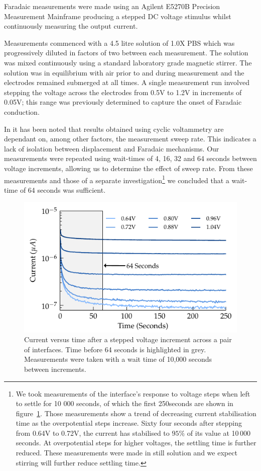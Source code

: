 \documentclass[journal, a4paper]{IEEEtran}
\begin{document}
Faradaic measurements were made using an Agilent E5270B Precision Measurement Mainframe producing a stepped DC voltage stimulus whilst continuously measuring the output current.

Measurements commenced with a 4.5 litre solution of 1.0X PBS which was progressively diluted in factors of two between each measurement. The solution was mixed continuously using a standard laboratory grade magnetic stirrer. The solution was in equilibrium with air prior to and during measurement and the electrodes remained submerged at all times.
A single measurement run involved stepping the voltage across the electrodes from 0.5\thinspace V to 1.2\thinspace V in increments of 0.05\thinspace V; this range was previously determined to capture the onset of Faradaic conduction.

In \cite{Cogan2008} it has been noted that results obtained using cyclic voltammetry are dependant on, among other factors, the measurement sweep rate. This indicates a lack of isolation between displacement and Faradaic mechanisms. Our measurements were repeated using wait-times of 4, 16, 32 and 64 seconds between voltage increments, allowing us to determine the effect of sweep rate. From these measurements and those of a separate investigation\footnote{We took measurements of the interface's response to voltage steps when left to settle for 10 000 seconds, of which the first 250\thinspace seconds are shown in figure~\ref{fig:CPE_currentVsTime}. Those measurements show a trend of decreasing current stabilisation time as the overpotential steps increase. Sixty four seconds after stepping from 0.64\thinspace V to 0.72\thinspace V, the current has stabilised to $95\%$ of its value at 10\,000 seconds. At overpotential steps for higher voltages, the settling time is further reduced. These measurements were made in still solution and we expect stirring will further reduce settling time.} we concluded that a wait-time of 64 seconds was sufficient.
\begin{figure}
    \begin{center}
        \includegraphics{graphics/CPE_currentVsTime}
    \end{center}
    \caption{Current versus time after a stepped voltage increment across a pair of interfaces. Time before 64 seconds is highlighted in grey. Measurements were taken with a wait time of 10,000 seconds between increments.}
    \label{fig:CPE_currentVsTime}
\end{figure}
\end{document}
